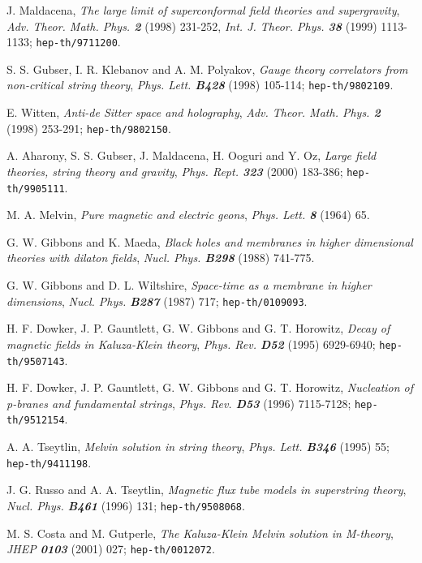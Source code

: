 \documentclass[a4paper,aps,nofootinbib,showpacs,preprint]{revtex4}
\begin{document}
\begin{thebibliography}{99}
    J. Maldacena,
    {\sl The large \coordHE{} limit of superconformal field theories and
         supergravity},
    {\it Adv. Theor. Math. Phys. \bf 2} (1998) 231-252,
    {\it Int. J. Theor. Phys. \bf 38} (1999) 1113-1133;
    {\tt hep-th/9711200}.

    S. S. Gubser, I. R. Klebanov and A. M. Polyakov,
    {\sl Gauge theory correlators from non-critical string theory},
    {\it Phys. Lett. \bf B428} (1998) 105-114;
    {\tt hep-th/9802109}.

    E. Witten,
    {\sl Anti-de Sitter space and holography},
    {\it Adv. Theor. Math. Phys. \bf 2} (1998) 253-291;
    {\tt hep-th/9802150}.

    A. Aharony, S. S. Gubser, J. Maldacena, H. Ooguri and Y. Oz,
    {\sl Large \coordHE{} field theories, string theory and gravity},
    {\it Phys. Rept. \bf 323} (2000) 183-386;
    {\tt hep-th/9905111}.

    M. A. Melvin,
    {\sl Pure magnetic and electric geons},
    {\it Phys. Lett. \bf 8} (1964) 65.

    G. W. Gibbons and K. Maeda,
    {\sl Black holes and membranes in higher dimensional theories
         with dilaton fields},
    {\it Nucl. Phys. \bf B298} (1988) 741-775.

    G. W. Gibbons and D. L. Wiltshire,
    {\sl Space-time as a membrane in higher dimensions},
    {\it Nucl. Phys. \bf B287} (1987) 717;
    {\tt hep-th/0109093}.

    H. F. Dowker, J. P. Gauntlett, G. W. Gibbons and G. T. Horowitz,
    {\sl Decay of magnetic fields in Kaluza-Klein theory},
    {\it Phys. Rev. \bf D52} (1995) 6929-6940;
    {\tt hep-th/9507143}.

    H. F. Dowker, J. P. Gauntlett, G. W. Gibbons and G. T. Horowitz,
    {\sl Nucleation of p-branes and fundamental strings},
    {\it Phys. Rev. \bf D53} (1996) 7115-7128;
    {\tt hep-th/9512154}.

    A. A. Tseytlin,
    {\sl Melvin solution in string theory},
    {\it Phys. Lett. \bf B346} (1995) 55;
    {\tt hep-th/9411198}.

    J. G. Russo and A. A. Tseytlin,
    {\sl Magnetic flux tube models in superstring theory},
    {\it Nucl. Phys. \bf B461} (1996) 131;
    {\tt hep-th/9508068}.

    M. S. Costa and M. Gutperle,
    {\sl The Kaluza-Klein Melvin solution in M-theory},
    {\it JHEP \bf 0103} (2001) 027;
    {\tt hep-th/0012072}.


\end{thebibliography}
\end{document}
